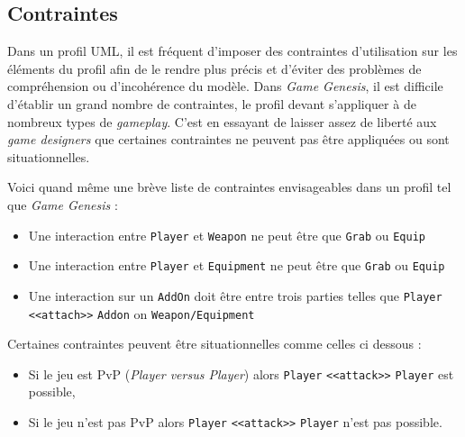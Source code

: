 

\subsection{Contraintes}

Dans un profil UML, il est fréquent d'imposer des contraintes d'utilisation sur les \'el\'ements du profil afin de le rendre plus précis et d'éviter des problèmes de compréhension ou d'incohérence du modèle.
Dans \emph{Game Genesis}, il est difficile d'établir un grand nombre de contraintes, le profil devant s'appliquer à de nombreux types de \emph{gameplay}.
C'est en essayant de laisser assez de liberté aux \emph{game designers} que certaines contraintes ne peuvent pas être appliquées ou sont situationnelles.

Voici quand m\^eme une br\`eve liste de contraintes envisageables dans un profil tel que \emph{Game Genesis} :
\begin{itemize}
    \item Une interaction entre \texttt{Player} et \texttt{Weapon} ne peut être que \texttt{Grab} ou \texttt{Equip}
    \item Une interaction entre \texttt{Player} et \texttt{Equipment} ne peut être que \texttt{Grab} ou \texttt{Equip}
    \item Une interaction sur un \texttt{AddOn} doit être entre trois parties telles que \texttt{Player} \texttt{<<attach>>} \texttt{Addon} on \texttt{Weapon/Equipment}
\end{itemize}

Certaines contraintes peuvent être situationnelles comme celles ci dessous :
\begin{itemize}
    \item Si le jeu est PvP (\emph{Player versus Player}) alors \texttt{Player} \texttt{<<attack>>} \texttt{Player} est possible,
    \item Si le jeu n'est pas PvP alors \texttt{Player} \texttt{<<attack>>} \texttt{Player} n'est pas possible.
\end{itemize}


